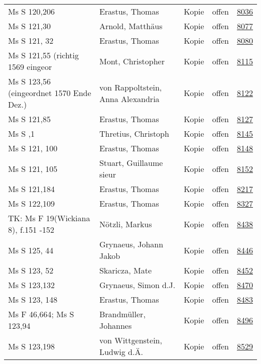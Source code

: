 \documentclass[10pt,a4paper,landscape]{report}
\begin{document}
\begin{longtable}{p{16cm}p{4cm}llr}
Ms S 120,206	&	Erastus, Thomas	&	Kopie	&	offen	&	\href{http://130.60.24.72/assignment/8036}{8036}\\
Ms S 121,30	&	Arnold, Matthäus	&	Kopie	&	offen	&	\href{http://130.60.24.72/assignment/8077}{8077}\\
Ms S 121, 32	&	Erastus, Thomas	&	Kopie	&	offen	&	\href{http://130.60.24.72/assignment/8080}{8080}\\
Ms S 121,55 (richtig 1569 eingeor	&	Mont, Christopher	&	Kopie	&	offen	&	\href{http://130.60.24.72/assignment/8115}{8115}\\
Ms S 123,56 (eingeordnet 1570 Ende Dez.)	&	von Rappoltstein, Anna Alexandria	&	Kopie	&	offen	&	\href{http://130.60.24.72/assignment/8122}{8122}\\
Ms S 121,85	&	Erastus, Thomas	&	Kopie	&	offen	&	\href{http://130.60.24.72/assignment/8127}{8127}\\
Ms S ,1	&	Thretius, Christoph	&	Kopie	&	offen	&	\href{http://130.60.24.72/assignment/8145}{8145}\\
Ms S 121, 100	&	Erastus, Thomas	&	Kopie	&	offen	&	\href{http://130.60.24.72/assignment/8148}{8148}\\
Ms S 121, 105	&	Stuart, Guillaume sieur	&	Kopie	&	offen	&	\href{http://130.60.24.72/assignment/8152}{8152}\\
Ms S 121,184	&	Erastus, Thomas	&	Kopie	&	offen	&	\href{http://130.60.24.72/assignment/8217}{8217}\\
Ms S 122,109	&	Erastus, Thomas	&	Kopie	&	offen	&	\href{http://130.60.24.72/assignment/8327}{8327}\\
TK: Ms F 19(Wickiana 8), f.151 -152	&	Nötzli, Markus	&	Kopie	&	offen	&	\href{http://130.60.24.72/assignment/8438}{8438}\\
Ms S 125, 44	&	Grynaeus, Johann Jakob	&	Kopie	&	offen	&	\href{http://130.60.24.72/assignment/8446}{8446}\\
Ms S 123, 52	&	Skaricza, Mate	&	Kopie	&	offen	&	\href{http://130.60.24.72/assignment/8452}{8452}\\
Ms S 123,132	&	Grynaeus, Simon d.J.	&	Kopie	&	offen	&	\href{http://130.60.24.72/assignment/8470}{8470}\\
Ms S 123, 148	&	Erastus, Thomas	&	Kopie	&	offen	&	\href{http://130.60.24.72/assignment/8483}{8483}\\
Ms F 46,664; Ms S 123,94	&	Brandmüller, Johannes	&	Kopie	&	offen	&	\href{http://130.60.24.72/assignment/8496}{8496}\\
Ms S 123,198	&	von Wittgenstein, Ludwig d.Ä.	&	Kopie	&	offen	&	\href{http://130.60.24.72/assignment/8529}{8529}\\

\end{longtable}
\end{document}
